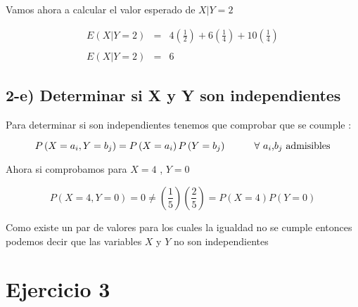 \documentclass[12pt]{article}
\begin{document}
\begin{flushleft}
    Vamos ahora a calcular el valor esperado de $X|Y=2$
\end{flushleft}

\begin{equation*}
    \begin{array}{rcl}
        \displaystyle E\left(X|Y=2\right) & = & \displaystyle 4 \left(\frac{1}{2}\right) + 6 \left(\frac{1}{4}\right) + 10\left(\frac{1}{4}\right)
        \\
        \\
        \displaystyle E\left(X|Y=2\right) & = & 6
    \end{array}
\end{equation*}


\subsection*{2-e)  Determinar si X y Y  son independientes}

\begin{flushleft}
    Para determinar si son independientes tenemos que comprobar que se coumple :


    \begin{equation*}
        P \left(X = a_i , Y = b_j\right)  = P \left(X = a_i\right) P \left(Y= b_j\right)
        \hspace*{1cm }
        \mbox{$\forall$ $a_i$,$b_j$ admisibles}
    \end{equation*}


    Ahora si comprobamos para $X = 4 $ , $Y = 0$


    \begin{equation*}
        P \left(X =4 , Y =0 \right) = 0 \neq \left(\frac{1}{5}\right) \left(\frac{2}{5}\right)  = P\left(X =4 \right)  P \left(Y = 0\right)
    \end{equation*}


    Como existe un par de valores para los cuales la igualdad no se cumple entonces
    podemos decir que las variables $X$ y $Y$ no son independientes
\end{flushleft}



\section*{Ejercicio 3}
\end{document}
